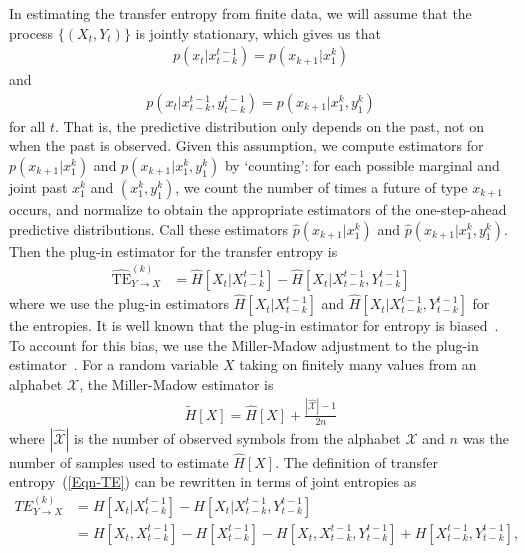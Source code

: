 In estimating the transfer entropy from finite data, we will assume that the process $\{(X_{t}, Y_{t})\}$ is jointly stationary, which gives us that
\begin{align}
	p(x_{t} | x_{t-k}^{t-1}) = p(x_{k+1} | x_{1}^{k})
\end{align}
and
\begin{align}
	p(x_{t} | x_{t-k}^{t-1}, y_{t-k}^{t-1}) = p(x_{k+1} | x_{1}^{k}, y_{1}^{k})
\end{align}
for all $t$. That is, the predictive distribution only depends on the past, not on when the past is observed. Given this assumption, we compute estimators for $p(x_{k+1} | x_{1}^{k})$ and $p(x_{k+1} | x_{1}^{k}, y_{1}^{k})$ by `counting': for each possible marginal and joint past $x_{1}^{k}$ and $(x_{1}^{k}, y_{1}^{k})$, we count the number of times a future of type $x_{k+1}$ occurs, and normalize to obtain the appropriate estimators of the one-step-ahead predictive distributions. Call these estimators $\hat{p}(x_{k+1} | x_{1}^{k})$ and $\hat{p}(x_{k+1} | x_{1}^{k}, y_{1}^{k})$. Then the plug-in estimator for the transfer entropy is
\begin{align}
	\widehat{\text{TE}}_{Y \to X}^{(k)} &= \hat{H}\left[X_{t} | X_{t-k}^{t-1}\right] - \hat{H}\left[X_{t} | X_{t-k}^{t-1}, Y_{t-k}^{t-1}\right]
\end{align}
where we use the plug-in estimators $\hat{H}\left[X_{t} | X_{t-k}^{t-1}\right]$ and $\hat{H}\left[X_{t} | X_{t-k}^{t-1}, Y_{t-k}^{t-1}\right]$ for the entropies. It is well known that the plug-in estimator for entropy is biased~\cite{paninski2003estimation}. To account for this bias, we use the Miller-Madow adjustment to the plug-in estimator~\cite{miller1955note}. For a random variable $X$ taking on finitely many values from an alphabet $\mathcal{X}$, the Miller-Madow estimator is
	\begin{align}
		\tilde{H}[X] = \hat{H}[X] + \frac{|\hat{\mathcal{X}}| - 1}{2 n}
	\end{align}
	where $|\mathcal{\hat{X}}|$ is the number of observed symbols from the alphabet $\mathcal{X}$ and $n$ was the number of samples used to estimate $\hat{H}[X].$ The definition of transfer entropy~(\ref{Eqn-TE}) can be rewritten in terms of joint entropies as
	\begin{align}
		TE_{Y \to X}^{(k)} &= H[X_t | X_{t-k}^{t-1}] - H[X_t | X_{t-k}^{t-1},Y_{t-k}^{t-1}] \\ 
		&= H[X_t,X_{t-k}^{t-1}]-H[X_{t-k}^{t-1}]-H[X_t,X_{t-k}^{t-1},Y_{t-k}^{t-1}]+H[X_{t-k}^{t-1},Y_{t-k}^{t-1}],
	\end{align}
